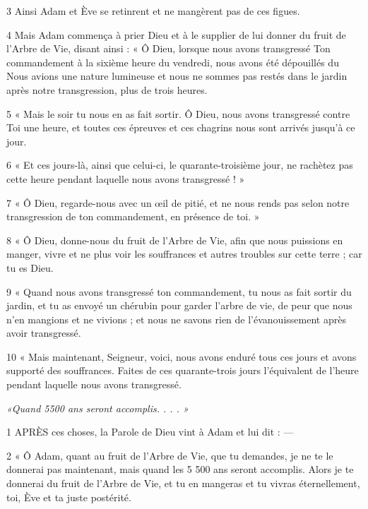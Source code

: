 \par 3 Ainsi Adam et Ève se retinrent et ne mangèrent pas de ces figues.

\par 4 Mais Adam commença à prier Dieu et à le supplier de lui donner du fruit de l'Arbre de Vie, disant ainsi : « Ô Dieu, lorsque nous avons transgressé Ton commandement à la sixième heure du vendredi, nous avons été dépouillés du Nous avions une nature lumineuse et nous ne sommes pas restés dans le jardin après notre transgression, plus de trois heures.

\par 5 « Mais le soir tu nous en as fait sortir. Ô Dieu, nous avons transgressé contre Toi une heure, et toutes ces épreuves et ces chagrins nous sont arrivés jusqu'à ce jour.

\par 6 « Et ces jours-là, ainsi que celui-ci, le quarante-troisième jour, ne rachètez pas cette heure pendant laquelle nous avons transgressé ! »

\par 7 « Ô Dieu, regarde-nous avec un œil de pitié, et ne nous rends pas selon notre transgression de ton commandement, en présence de toi. »

\par 8 « Ô Dieu, donne-nous du fruit de l'Arbre de Vie, afin que nous puissions en manger, vivre et ne plus voir les souffrances et autres troubles sur cette terre ; car tu es Dieu.

\par 9 « Quand nous avons transgressé ton commandement, tu nous as fait sortir du jardin, et tu as envoyé un chérubin pour garder l'arbre de vie, de peur que nous n'en mangions et ne vivions ; et nous ne savons rien de l’évanouissement après avoir transgressé.

\par 10 « Mais maintenant, Seigneur, voici, nous avons enduré tous ces jours et avons supporté des souffrances. Faites de ces quarante-trois jours l’équivalent de l’heure pendant laquelle nous avons transgressé.


\par \textit{«Quand 5500 ans seront accomplis. . . . »}

\par 1 APRÈS ces choses, la Parole de Dieu vint à Adam et lui dit : —

\par 2 « Ô Adam, quant au fruit de l'Arbre de Vie, que tu demandes, je ne te le donnerai pas maintenant, mais quand les 5 500 ans seront accomplis. Alors je te donnerai du fruit de l'Arbre de Vie, et tu en mangeras et tu vivras éternellement, toi, Ève et ta juste postérité.

